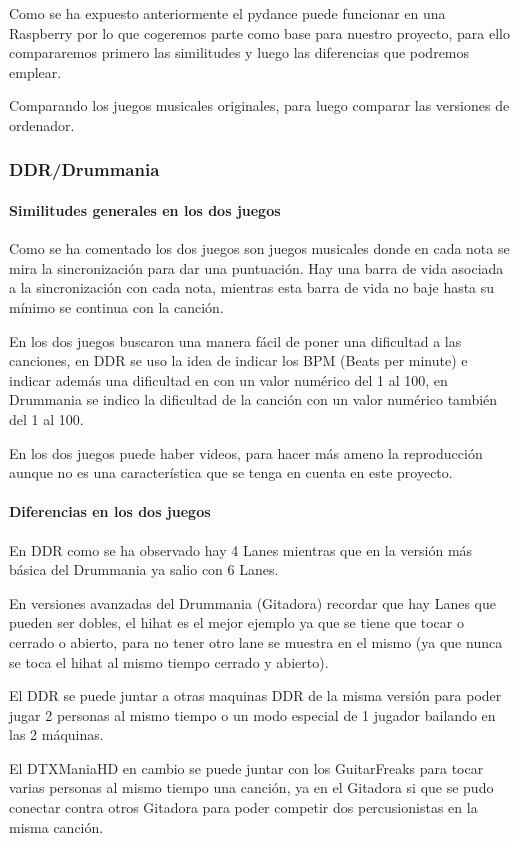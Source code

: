 \documentclass[a4paper,11pt,oneside]{book}
\begin{document}
Como se ha expuesto anteriormente el pydance puede funcionar en una Raspberry  por lo que cogeremos parte como base para nuestro proyecto, para ello compararemos primero las similitudes y luego las diferencias que podremos emplear.

Comparando los juegos musicales originales, para luego comparar las versiones de ordenador.

\subsubsection{DDR/Drummania}
\paragraph{Similitudes generales en los dos juegos}
Como se ha comentado los dos juegos son juegos musicales donde en cada nota se mira la sincronización para dar una puntuación. Hay una barra de vida asociada a la sincronización con cada nota, mientras esta barra de vida no baje hasta su mínimo se continua con la canción.

En los dos juegos buscaron una manera fácil de poner una dificultad a las canciones, en DDR se uso la idea de indicar los BPM (Beats per minute) e indicar además una dificultad en con un valor numérico del 1 al 100, en Drummania se indico la dificultad de la canción con un valor numérico también del 1 al 100.

En los dos juegos puede haber videos, para hacer más ameno la reproducción aunque no es una característica que se tenga en cuenta en este proyecto.

\paragraph{Diferencias en los dos juegos}
En DDR como se ha observado hay 4 \gls{Lanes} mientras que en la versión más básica del Drummania ya salio con 6 \gls{Lanes}.

En versiones avanzadas del Drummania (Gitadora) recordar que hay \gls{Lanes} que pueden ser dobles, el hihat es el mejor ejemplo ya que se tiene que tocar o cerrado o abierto, para no tener otro lane se muestra en el mismo (ya que nunca se toca el hihat al mismo tiempo cerrado y abierto).

El DDR se puede juntar a otras maquinas DDR de la misma versión para poder jugar 2 personas al mismo tiempo o un modo especial de 1 jugador bailando en las 2 máquinas.

El DTXManiaHD en cambio se puede juntar con los GuitarFreaks para tocar varias personas al mismo tiempo una canción, ya en el Gitadora si que se pudo conectar contra otros Gitadora para poder competir dos percusionistas en la misma canción.
\end{document}
